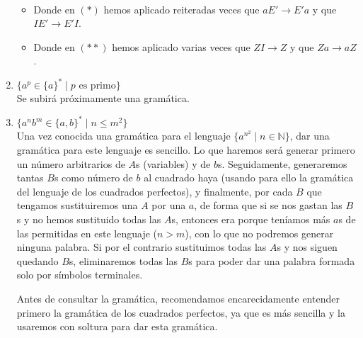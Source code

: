 \begin{ejercicio}
\begin{enumerate}
\begin{align*}
            \end{align*}
            \begin{itemize}
                \item Donde en $(\ast)$ hemos aplicado reiteradas veces que $aE'\rightarrow E'a$ y que $IE'\rightarrow E'I$.
                \item Donde en $(\ast\ast)$ hemos aplicado varias veces que $ZI\rightarrow Z$ y que $Za\rightarrow aZ$.
            \end{itemize}
        \item $\{a^p \in \{a\}^{\ast} \mid p \text{ es primo}\}$\\

            Se subirá próximamente una gramática.
        \item $\{a^nb^m \in \{a,b\}^{\ast} \mid n\leq m^2\}$\\

            Una vez conocida una gramática para el lenguaje $\{a^{n^2} \mid n \in \mathbb{N}\}$, dar una gramática para este lenguaje es sencillo. Lo que haremos será generar primero un número arbitrarios de $A$s (variables) y de $b$s. Seguidamente, generaremos tantas $B$s como número de $b$ al cuadrado haya (usando para ello la gramática del lenguaje de los cuadrados perfectos), y finalmente, por cada $B$ que tengamos sustituiremos una $A$ por una $a$, de forma que si se nos gastan las $B$s y no hemos sustituido todas las $A$s, entonces era porque teníamos más $a$s de las permitidas en este lenguaje ($n>m$), con lo que no podremos generar ninguna palabra. Si por el contrario sustituimos todas las $A$s y nos siguen quedando $B$s, eliminaremos todas las $B$s para poder dar una palabra formada solo por símbolos terminales.

            Antes de consultar la gramática, recomendamos encarecidamente entender primero la gramática de los cuadrados perfectos, ya que es más sencilla y la usaremos con soltura para dar esta gramática.


\end{enumerate}
\end{ejercicio}
